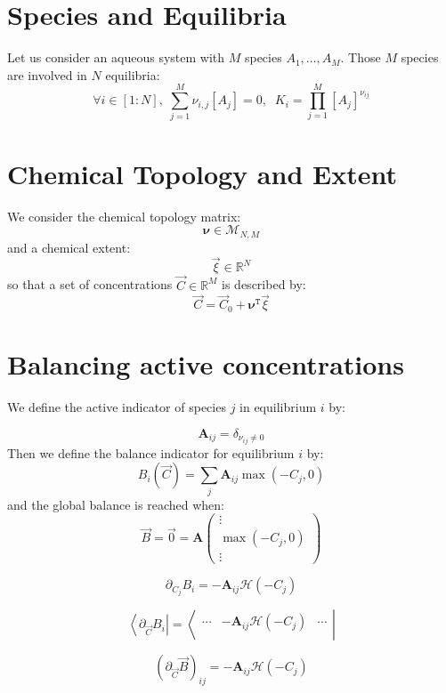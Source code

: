 \documentclass[aps,12pt]{revtex4}
\newcommand{\trn}[1]{{#1}^{\mathtt{T}}}
\newcommand{\conc}[1]{{\left[#1\right]}}
\begin{document}
\section{Species and Equilibria}
Let us consider an aqueous system with $M$ species $A_1,\ldots,A_M$.
Those $M$ species are involved in $N$ equilibria:
\begin{equation}
	\forall i\in[1:N], \; \sum_{j=1}^M \nu_{i,j} \conc{A_j} = 0,
	 \;\; K_i = \prod_{j=1}^M \conc{A_j}^{\nu_{ij}}
\end{equation}

\section{Chemical Topology and Extent}
We consider the chemical topology matrix:
\begin{equation}
	\bm{\nu} \in \mathcal{M}_{N,M}
\end{equation}
and a chemical extent:
\begin{equation}
	\vec{\xi} \in \mathbb{R}^{N}
\end{equation}
so that a set of concentrations $\vec{C}\in\mathbb{R}^M$ is described by:
\begin{equation}
	\vec{C} = \vec{C}_0 + \trn{\bm{\nu}} \vec{\xi}
\end{equation}


\section{Balancing active concentrations}

We define the active indicator of species $j$ in equilibrium $i$ by:

\begin{equation}
	 \bm{A}_{ij} = \delta_{\nu_{ij} \not= 0}
\end{equation}
Then we define the balance indicator for equilibrium $i$ by:
\begin{equation}
	 B_i(\vec{C}) = \sum_j  \bm{A}_{ij} \max(-C_j,0)
\end{equation}
and the global balance is reached when:
\begin{equation}
	\vec{ {B}} = \vec{0} = \bm{A} 
	\begin{pmatrix}
	\vdots\\
	\max(-C_j,0)\\
	\vdots
	\end{pmatrix}
\end{equation}
 
\begin{equation}
	\partial_{C_j} B_i = -\bm{A}_{ij} \mathcal{H}(-C_j)
\end{equation}
 
\begin{equation}
	\left<\partial_{\vec{C}} B_i\right| =
	\left<
 		\begin{array}{ccc}
	 	\cdots &  	 -\bm{A}_{ij} \mathcal{H}(-C_j) & \cdots\\
		\end{array}
	\right|
\end{equation}

\begin{equation}
	\left(\partial_{\vec{C}}\vec{B}\right)_{ij} =  - \bm{A}_{ij} \mathcal{H}(-C_j)
\end{equation}
 

 
\end{document}
